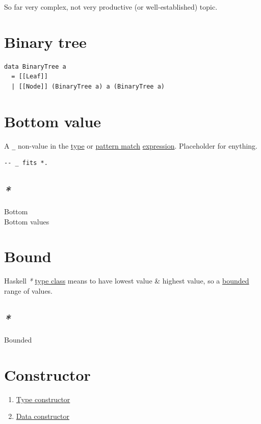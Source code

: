 \documentclass[a4paper,14pt,oneside]{book}
\begin{document}
So far very complex, not very productive (or well-established) topic.\\

\section{\label{orga861020}Binary tree}
\label{sec:orgf43a7c1}
\begin{verbatim}
data BinaryTree a
  = [[Leaf]]
  | [[Node]] (BinaryTree a) a (BinaryTree a)
\end{verbatim}

\section{\label{org0a4af37}Bottom value}
\label{sec:org5d8bd0e}
A \texttt{\_} non-value in the \hyperref[orgb064f4e]{type} or \hyperref[org9274a8c]{pattern match} \hyperref[orgc25ca10]{expression}. Placeholder for enything.\\

\begin{verbatim}
-- _ fits *.
\end{verbatim}

\subsection{\emph{*}}
\label{sec:org3063d09}

\label{org69a44b1}Bottom\\
\label{org57c738c}Bottom values\\

\section{\label{org6c4e380}Bound}
\label{sec:org286984d}
Haskell \emph{*} \hyperref[org876c934]{type class} means to have lowest value \& highest value, so a \hyperref[org2ee511f]{bounded} range of values.\\

\subsection{\emph{*}}
\label{sec:org91a30e7}

\label{org2ee511f}Bounded\\

\section{\label{orgca697a7}Constructor}
\label{sec:org4cfe9b8}
\begin{enumerate}
\item \hyperref[org4b86fc1]{Type constructor}\\
\item \hyperref[orgfef0bae]{Data constructor}\\
\end{enumerate}
\end{document}
